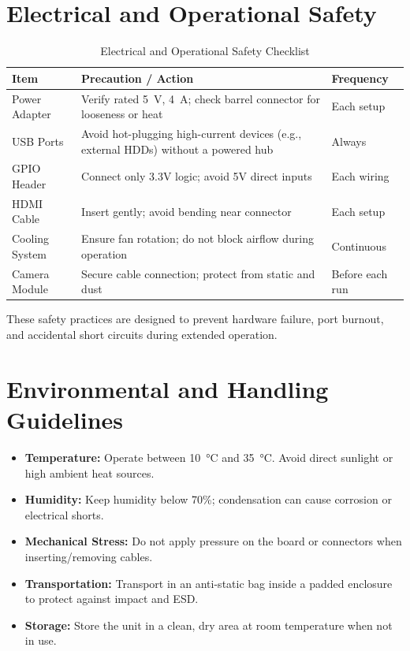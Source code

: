 \section{Electrical and Operational Safety}

\begin{table}[H]
	\centering
	\caption{Electrical and Operational Safety Checklist}
	\begin{tabular}{|L{3.8cm}|L{8.2cm}|L{2.2cm}|}
		\hline
		\textbf{Item} & \textbf{Precaution / Action} & \textbf{Frequency} \\ \hline
		Power Adapter & Verify rated \SI{5}{\volt}, \SI{4}{\ampere}; check barrel connector for looseness or heat & Each setup \\ \hline
		USB Ports & Avoid hot-plugging high-current devices (e.g., external HDDs) without a powered hub & Always \\ \hline
		GPIO Header & Connect only 3.3V logic; avoid 5V direct inputs & Each wiring \\ \hline
		HDMI Cable & Insert gently; avoid bending near connector & Each setup \\ \hline
		Cooling System & Ensure fan rotation; do not block airflow during operation & Continuous \\ \hline
		Camera Module & Secure cable connection; protect from static and dust & Before each run \\ \hline
	\end{tabular}
\end{table}

These safety practices are designed to prevent hardware failure, port burnout, and accidental short circuits during extended operation.

\vspace{0.4cm}

\section{Environmental and Handling Guidelines}

\begin{itemize}
	\item \textbf{Temperature:} Operate between \SI{10}{\celsius} and \SI{35}{\celsius}. Avoid direct sunlight or high ambient heat sources.
	\item \textbf{Humidity:} Keep humidity below 70\%; condensation can cause corrosion or electrical shorts.
	\item \textbf{Mechanical Stress:} Do not apply pressure on the board or connectors when inserting/removing cables.
	\item \textbf{Transportation:} Transport in an anti-static bag inside a padded enclosure to protect against impact and ESD.
	\item \textbf{Storage:} Store the unit in a clean, dry area at room temperature when not in use.
\end{itemize}

